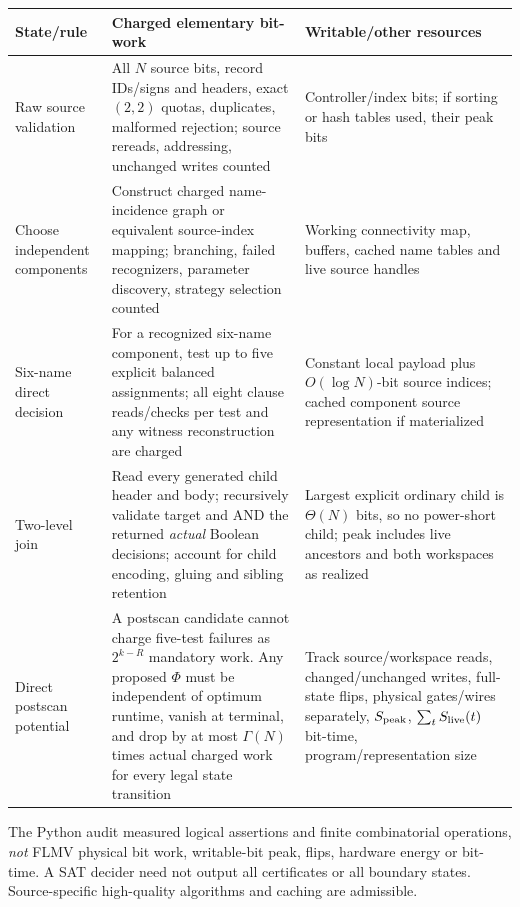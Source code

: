 \documentclass[11pt]{article}
\begin{document}
\begin{longtable}{p{.21\linewidth}p{.49\linewidth}p{.22\linewidth}}
\toprule
State/rule & Charged elementary bit-work & Writable/other resources\\
\midrule
Raw source validation & All $N$ source bits, record IDs/signs and headers, exact $(2,2)$ quotas, duplicates, malformed rejection; source rereads, addressing, unchanged writes counted & Controller/index bits; if sorting or hash tables used, their peak bits\\
Choose independent components & Construct charged name-incidence graph or equivalent source-index mapping; branching, failed recognizers, parameter discovery, strategy selection counted & Working connectivity map, buffers, cached name tables and live source handles\\
Six-name direct decision & For a recognized six-name component, test up to five explicit balanced assignments; all eight clause reads/checks per test and any witness reconstruction are charged & Constant local payload plus $O(\log N)$-bit source indices; cached component source representation if materialized\\
Two-level join & Read every generated child header and body; recursively validate target and AND the returned \emph{actual} Boolean decisions; account for child encoding, gluing and sibling retention & Largest explicit ordinary child is $\Theta(N)$ bits, so no power-short child; peak includes live ancestors and both workspaces as realized\\
Direct postscan potential & A postscan candidate cannot charge five-test failures as $2^{k-R}$ mandatory work. Any proposed $\Phi$ must be independent of optimum runtime, vanish at terminal, and drop by at most $\Gamma(N)$ times actual charged work for every legal state transition & Track source/workspace reads, changed/unchanged writes, full-state flips, physical gates/wires separately, $S_{\rm peak}$, $\sum_t S_{\rm live}(t)$ bit-time, program/representation size\\
\bottomrule
\end{longtable}
The Python audit measured logical assertions and finite combinatorial operations, \emph{not} FLMV physical bit work, writable-bit peak, flips, hardware energy or bit-time. A SAT decider need not output all certificates or all boundary states. Source-specific high-quality algorithms and caching are admissible.
\end{document}

